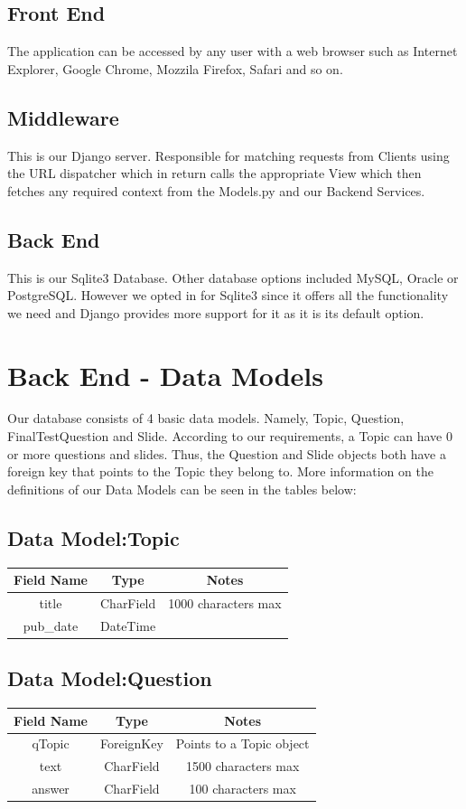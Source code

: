 \documentclass{l3proj}
\begin{document}
{\subsection{Front End}
The application can be accessed by any user with a web browser such as Internet 
Explorer, Google Chrome, Mozzila Firefox, Safari and so on. \\
\subsection{Middleware}
This is our Django server. Responsible for matching requests from Clients using the 
URL dispatcher which in return calls the appropriate View which then fetches any 
required context from the Models.py and our Backend Services. 
\subsection{Back End}
This is our Sqlite3 Database. Other database options included MySQL, Oracle or 
PostgreSQL. However we opted in for Sqlite3 since it offers all the functionality we 
need and Django provides more support for it as it is its default option. \\
\section{Back End - Data Models}
Our database consists of 4 basic data models. Namely, Topic, Question, FinalTestQuestion and Slide. According to our requirements, a Topic can have 0 or more questions and slides. Thus, the Question and Slide objects both have a foreign key that points to the Topic they belong to. More information on the definitions of our Data Models can be seen in the tables below: 
\subsection{Data Model:Topic}
\begin{tabular}{|c|c|c|}
\hline \textbf{Field Name} & \textbf{Type} & \textbf{Notes}\\
\hline title & CharField & 1000 characters max \\ 
\hline pub\_date & DateTime &  \\ \hline
\end{tabular}
\subsection{Data Model:Question}
\begin{tabular}{|c|c|c|}
\hline \textbf{Field Name} & \textbf{Type} & \textbf{Notes}\\
\hline qTopic & ForeignKey & Points to a Topic object \\ 
\hline text & CharField & 1500 characters max \\
\hline answer & CharField & 100 characters max \\ \hline
\end{tabular}

}
\end{document}
